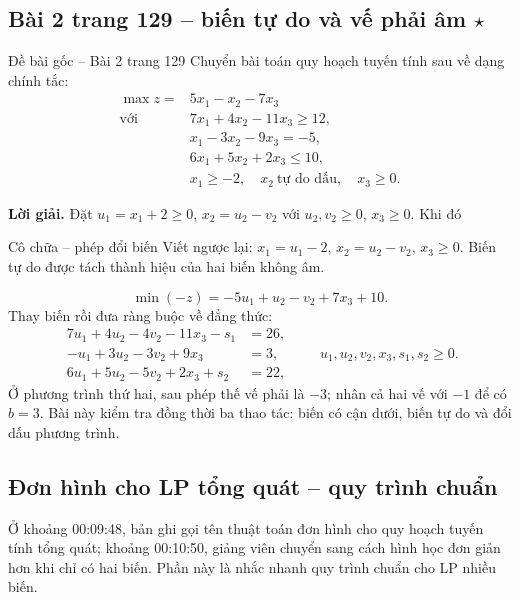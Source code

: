 \documentclass[11pt,a4paper]{article}
\begin{document}
\subsection{Bài 2 trang 129 -- biến tự do và vế phải âm \(\star\)}
\begin{questionbox}{Đề bài gốc -- Bài 2 trang 129}
Chuyển bài toán quy hoạch tuyến tính sau về dạng chính tắc:
\[
\begin{aligned}
\max z={}&5x_1-x_2-7x_3\\
\text{với }&
7x_1+4x_2-11x_3\ge12,\\
&x_1-3x_2-9x_3=-5,\\
&6x_1+5x_2+2x_3\le10,\\
&x_1\ge-2,\quad x_2\ \text{tự do dấu},\quad x_3\ge0.
\end{aligned}
\]
\end{questionbox}
\textbf{Lời giải.}
Đặt \(u_1=x_1+2\ge0\), \(x_2=u_2-v_2\) với \(u_2,v_2\ge0\), \(x_3\ge0\). Khi đó
\begin{answerbox}{Cô chữa -- phép đổi biến}
Viết ngược lại: \(x_1=u_1-2\), \(x_2=u_2-v_2\), \(x_3\ge0\). Biến tự do được tách thành hiệu của hai biến không âm.
\end{answerbox}
\[
\min(-z)=-5u_1+u_2-v_2+7x_3+10.
\]
Thay biến rồi đưa ràng buộc về đẳng thức:
\[
\begin{aligned}
7u_1+4u_2-4v_2-11x_3-s_1&=26,\\
-u_1+3u_2-3v_2+9x_3&=3,\\
6u_1+5u_2-5v_2+2x_3+s_2&=22,
\end{aligned}
\qquad
u_1,u_2,v_2,x_3,s_1,s_2\ge0.
\]
Ở phương trình thứ hai, sau phép thế vế phải là \(-3\); nhân cả hai vế với \(-1\) để có \(b=3\). Bài này kiểm tra đồng thời ba thao tác: biến có cận dưới, biến tự do và đổi dấu phương trình.

\subsection{Đơn hình cho LP tổng quát -- quy trình chuẩn}
Ở khoảng 00:09:48, bản ghi gọi tên thuật toán đơn hình cho quy hoạch tuyến tính tổng quát; khoảng 00:10:50, giảng viên chuyển sang cách hình học đơn giản hơn khi chỉ có hai biến. Phần này là nhắc nhanh quy trình chuẩn cho LP nhiều biến.
\end{document}
